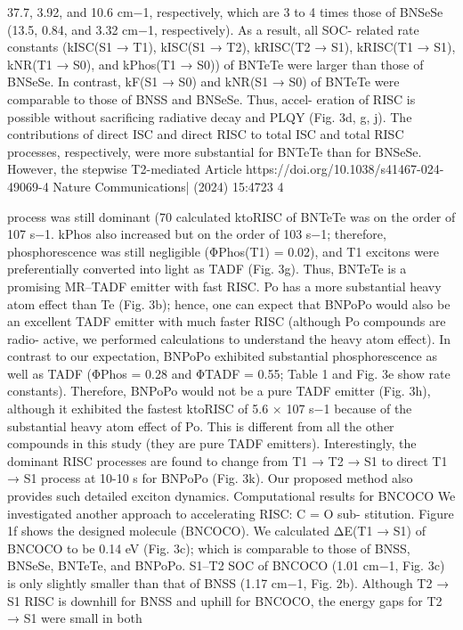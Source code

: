 37.7, 3.92, and 10.6 cm−1, respectively, which are 3 to 4 times those of
BNSeSe (13.5, 0.84, and 3.32 cm−1, respectively). As a result, all SOC-
related
rate
constants
(kISC(S1 → T1),
kISC(S1 → T2),
kRISC(T2 → S1),
kRISC(T1 → S1), kNR(T1 → S0), and kPhos(T1 → S0)) of BNTeTe were larger
than those of BNSeSe. In contrast, kF(S1 → S0) and kNR(S1 → S0) of
BNTeTe were comparable to those of BNSS and BNSeSe. Thus, accel-
eration of RISC is possible without sacriﬁcing radiative decay and
PLQY (Fig. 3d, g, j). The contributions of direct ISC and direct RISC to
total ISC and total RISC processes, respectively, were more substantial
for BNTeTe than for BNSeSe. However, the stepwise T2-mediated
Article
https://doi.org/10.1038/s41467-024-49069-4
Nature Communications|        (2024) 15:4723 
4


process was still dominant (70%
calculated ktoRISC of BNTeTe was on the order of 107 s−1. kPhos also
increased but on the order of 103 s−1; therefore, phosphorescence was
still negligible (ΦPhos(T1) = 0.02), and T1 excitons were preferentially
converted into light as TADF (Fig. 3g). Thus, BNTeTe is a promising
MR–TADF emitter with fast RISC.
Po has a more substantial heavy atom effect than Te (Fig. 3b);
hence, one can expect that BNPoPo would also be an excellent TADF
emitter with much faster RISC (although Po compounds are radio-
active, we performed calculations to understand the heavy atom
effect). In contrast to our expectation, BNPoPo exhibited substantial
phosphorescence as well as TADF (ΦPhos = 0.28 and ΦTADF = 0.55;
Table 1 and Fig. 3e show rate constants). Therefore, BNPoPo would not
be a pure TADF emitter (Fig. 3h), although it exhibited the fastest
ktoRISC of 5.6 × 107 s−1 because of the substantial heavy atom effect of
Po. This is different from all the other compounds in this study (they
are pure TADF emitters). Interestingly, the dominant RISC processes
are found to change from T1 → T2 → S1 to direct T1 → S1 process at 10-10 s
for BNPoPo (Fig. 3k). Our proposed method also provides such
detailed exciton dynamics.
Computational results for BNCOCO
We investigated another approach to accelerating RISC: C = O sub-
stitution. Figure 1f shows the designed molecule (BNCOCO). We
calculated ΔE(T1 → S1) of BNCOCO to be 0.14 eV (Fig. 3c); which is
comparable to those of BNSS, BNSeSe, BNTeTe, and BNPoPo. S1–T2
SOC of BNCOCO (1.01 cm−1, Fig. 3c) is only slightly smaller than that of
BNSS (1.17 cm−1, Fig. 2b). Although T2 → S1 RISC is downhill for BNSS
and uphill for BNCOCO, the energy gaps for T2 → S1 were small in both
